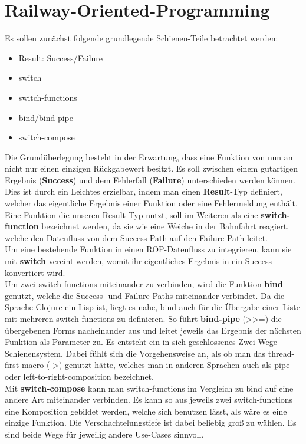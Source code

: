 \documentclass[10pt,journal,compsoc]{IEEEtran}
\begin{document}
  \section{Railway-Oriented-Programming}
  Es sollen zunächst folgende grundlegende Schienen-Teile betrachtet werden:
  \begin{itemize}
    \item Result: Success/Failure
    \item switch
    \item switch-functions
    \item bind/bind-pipe
    \item switch-compose
  \end{itemize}
  Die Grundüberlegung besteht in der Erwartung, dass eine Funktion von nun an nicht nur einen einzigen Rückgabewert besitzt.
  Es soll zwischen einem gutartigen Ergebnis (\textbf{Success}) und dem Fehlerfall (\textbf{Failure}) unterschieden werden können.
  Dies ist durch ein Leichtes erzielbar, indem man einen \textbf{Result}-Typ definiert, welcher das eigentliche Ergebnis einer Funktion oder eine Fehlermeldung enthält.\\
  Eine Funktion die unseren Result-Typ nutzt, soll im Weiteren als eine \textbf{switch-function} bezeichnet werden, da sie wie eine Weiche in der Bahnfahrt reagiert, welche den Datenfluss von dem Success-Path auf den Failure-Path leitet.\\
  Um eine bestehende Funktion in einen ROP-Datenfluss zu integrieren, kann sie mit \textbf{switch} vereint werden, womit ihr eigentliches Ergebnis in ein Success konvertiert wird.\\
  Um zwei switch-functions miteinander zu verbinden, wird die Funktion \textbf{bind} genutzt, welche die Success- und Failure-Paths miteinander verbindet.
  Da die Sprache Clojure ein Lisp ist, liegt es nahe, bind auch für die Übergabe einer Liste mit mehreren switch-functions zu definieren. So führt \textbf{bind-pipe} (>>=) die übergebenen Forms nacheinander aus und leitet jeweils das Ergebnis der nächsten Funktion als Parameter zu.
  Es entsteht ein in sich geschlossenes Zwei-Wege-Schienensystem.
  Dabei fühlt sich die Vorgehensweise an, als ob man das thread-first macro (->) genutzt hätte, welches man in anderen Sprachen auch als pipe oder left-to-right-composition bezeichnet.\\
  Mit \textbf{switch-compose} kann man switch-functions im Vergleich zu bind auf eine andere Art miteinander verbinden.
  Es kann so aus jeweils zwei switch-functions eine Komposition gebildet werden, welche sich benutzen lässt, als wäre es eine einzige Funktion. Die Verschachtelungstiefe ist dabei beliebig groß zu wählen.
  Es sind beide Wege für jeweilig andere Use-Cases sinnvoll.
\end{document}
